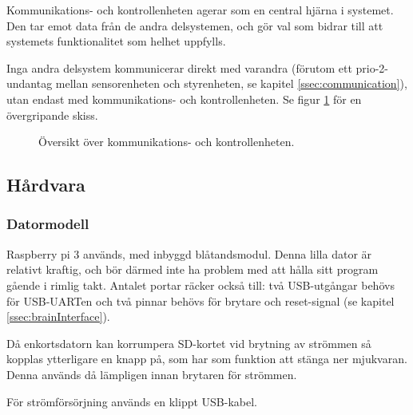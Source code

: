 \documentclass[a4paper,11pt]{article}
\begin{document}

Kommunikations- och kontrollenheten agerar som en central hjärna i systemet. Den tar emot data från de andra delsystemen, och gör val som bidrar till att systemets funktionalitet som helhet uppfylls.

Inga andra delsystem kommunicerar direkt med varandra (förutom ett prio-2-undantag mellan sensorenheten och styrenheten, se kapitel \ref{ssec:communication}), utan endast med kommunikations- och kontrollenheten. Se figur \ref{fig:unitBrain} för en övergripande skiss.

\begin{figure}[h!]
    \caption{Översikt över kommunikations- och kontrollenheten.  }
    \label{fig:unitBrain}
\end{figure}

\subsection{Hårdvara}

\subsubsection{Datormodell}
Raspberry pi 3 används, med inbyggd blåtandsmodul. Denna lilla dator är relativt kraftig, och bör därmed inte ha problem med att hålla sitt program gående i rimlig takt. Antalet portar räcker också till: två USB-utgångar behövs för USB-UARTen och två pinnar behövs för brytare och reset-signal (se kapitel \ref{ssec:brainInterface}).

Då enkortsdatorn kan korrumpera SD-kortet vid brytning av strömmen så kopplas ytterligare en knapp på, som har som funktion att stänga ner mjukvaran. Denna används då lämpligen innan brytaren för strömmen.

För strömförsörjning används en klippt USB-kabel.
\end{document}
